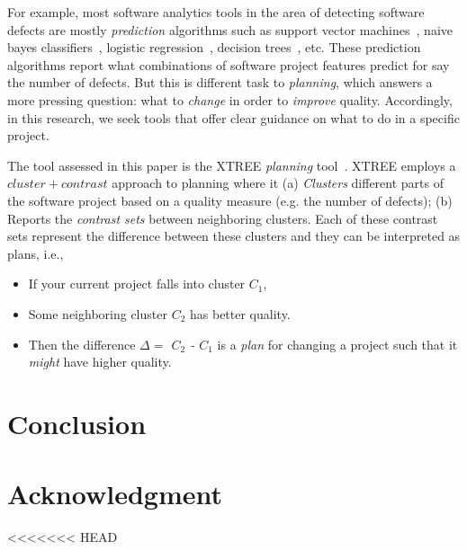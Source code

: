 \documentclass[conference]{IEEEtran}
\begin{document}
For example, most software analytics tools in the area of detecting software defects are mostly \textit{prediction} algorithms such as support vector machines~\cite{cortes95}, naive bayes classifiers~\cite{lessmann08}, logistic regression~\cite{lessmann08}, decision trees~\cite{dtrees}, etc. These prediction algorithms report what combinations of software project features predict for say the number of defects. But this is different task to \textit{planning}, which answers a more pressing question: what to {\em change} in order to {\em improve} quality. Accordingly, in this research, we seek tools that offer clear guidance on what to do in a specific project.

The tool assessed in this paper is the XTREE \textit{planning} tool~\cite{krishna17a}. XTREE employs a $cluster+contrast$ approach to planning where it (a) \textit{Clusters} different parts of the software project based on a quality measure (e.g. the number of defects); (b) Reports the \textit{contrast sets} between neighboring clusters. Each of these contrast sets represent the difference between these clusters and they can  be interpreted as plans, i.e., 
\begin{itemize}
	    \item If your current project falls into cluster $C_1$,
	    \item Some neighboring cluster $C_2$ has better quality.
	    \item Then the difference {\em $\Delta=$ $C_2$ - $C_1$} is a {\em plan} for changing a  project such that it \textit{might} have   higher quality.
\end{itemize}


\section{Conclusion}

\section*{Acknowledgment}


<<<<<<< HEAD

\end{document}
